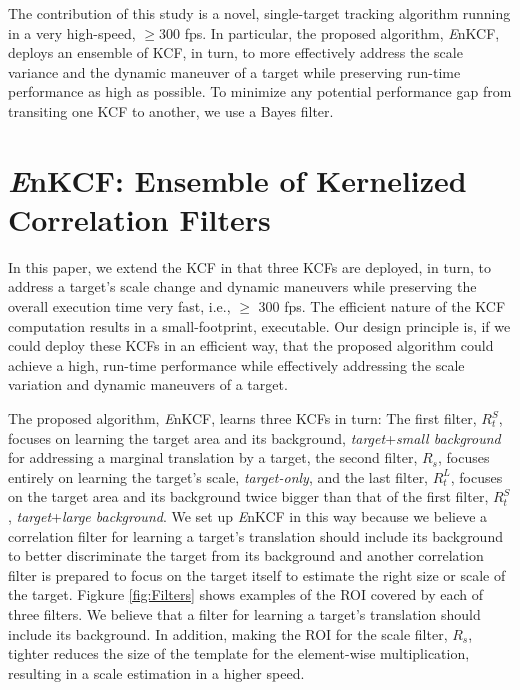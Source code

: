 \documentclass{bmvc2k}
\begin{document}
The contribution of this study is a novel, single-target tracking
algorithm running in a very high-speed, $\geq 300$ fps. In particular,
the proposed algorithm, {\it E}nKCF, deploys an ensemble of KCF, in
turn, to more effectively address the scale variance and the dynamic
maneuver of a target while preserving run-time performance as high as
possible. To minimize any potential performance gap from transiting
one KCF to another, we use a Bayes filter.

\section{{\it E}nKCF: Ensemble of Kernelized Correlation Filters}
In this paper, we extend the KCF in that three KCFs are deployed, in
turn, to address a target's scale change and dynamic maneuvers while
preserving the overall execution time very fast, i.e., $\ge$ 300
fps. The efficient nature of the KCF computation results in a
small-footprint, executable. Our design principle is, if we could
deploy these KCFs in an efficient way, that the proposed algorithm
could achieve a high, run-time performance while effectively
addressing the scale variation and dynamic maneuvers of a target.

The proposed algorithm, {\it E}nKCF, learns three KCFs in turn: The
first filter, $R_{t}^{S}$, focuses on learning the target area and its
background, \textit{target}+\textit{small background} for addressing a
marginal translation by a target, the second filter, $R_{s}$, focuses
entirely on learning the target's scale, \textit{target-only}, and the
last filter, $R_{t}^{L}$, focuses on the target area and its
background twice bigger than that of the first filter, $R_{t}^{S}$,
\textit{target}+\textit{large background}. We set up {\it E}nKCF in
this way because we believe a correlation filter for learning a
target's translation should include its background to better
discriminate the target from its background and another correlation
filter is prepared to focus on the target itself to estimate the right
size or scale of the target. Figkure \ref{fig:Filters} shows examples
of the ROI covered by each of three filters. We believe that a filter
for learning a target's translation should include its background. In
addition, making the ROI for the scale filter, $R_{s}$, tighter
reduces the size of the template for the element-wise multiplication,
resulting in a scale estimation in a higher speed.
\end{document}
